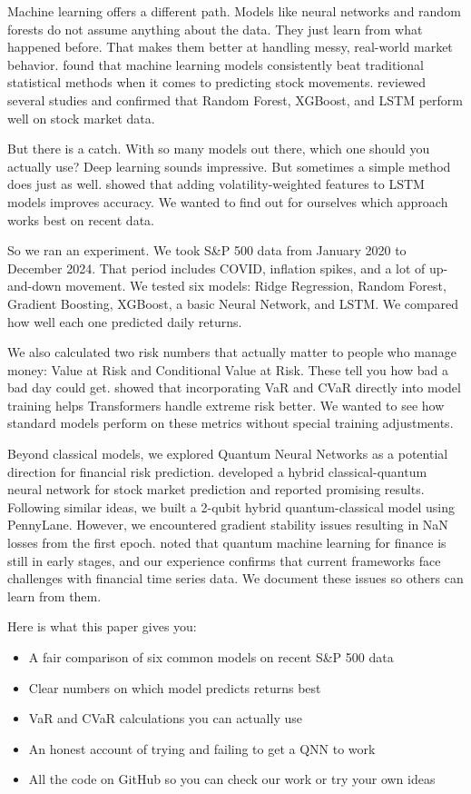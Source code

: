 \documentclass[12pt,a4paper]{article}
\begin{document}
Machine learning offers a different path. Models like neural networks and random forests do not assume anything about the data. They just learn from what happened before. That makes them better at handling messy, real-world market behavior. \citet{wang2026} found that machine learning models consistently beat traditional statistical methods when it comes to predicting stock movements. \citet{elalami2025b} reviewed several studies and confirmed that Random Forest, XGBoost, and LSTM perform well on stock market data.

But there is a catch. With so many models out there, which one should you actually use? Deep learning sounds impressive. But sometimes a simple method does just as well. \citet{abang2025} showed that adding volatility-weighted features to LSTM models improves accuracy. We wanted to find out for ourselves which approach works best on recent data.

So we ran an experiment. We took S\&P 500 data from January 2020 to December 2024. That period includes COVID, inflation spikes, and a lot of up-and-down movement. We tested six models: Ridge Regression, Random Forest, Gradient Boosting, XGBoost, a basic Neural Network, and LSTM. We compared how well each one predicted daily returns.

We also calculated two risk numbers that actually matter to people who manage money: Value at Risk and Conditional Value at Risk. These tell you how bad a bad day could get. \citet{zhang2024} showed that incorporating VaR and CVaR directly into model training helps Transformers handle extreme risk better. We wanted to see how standard models perform on these metrics without special training adjustments.

Beyond classical models, we explored Quantum Neural Networks as a potential direction for financial risk prediction. \citet{chen2025} developed a hybrid classical-quantum neural network for stock market prediction and reported promising results. Following similar ideas, we built a 2-qubit hybrid quantum-classical model using PennyLane. However, we encountered gradient stability issues resulting in NaN losses from the first epoch. \citet{chen2025} noted that quantum machine learning for finance is still in early stages, and our experience confirms that current frameworks face challenges with financial time series data. We document these issues so others can learn from them.

Here is what this paper gives you:
\begin{itemize}
\item A fair comparison of six common models on recent S\&P 500 data
\item Clear numbers on which model predicts returns best
\item VaR and CVaR calculations you can actually use
\item An honest account of trying and failing to get a QNN to work
\item All the code on GitHub so you can check our work or try your own ideas
\end{itemize}
\end{document}

